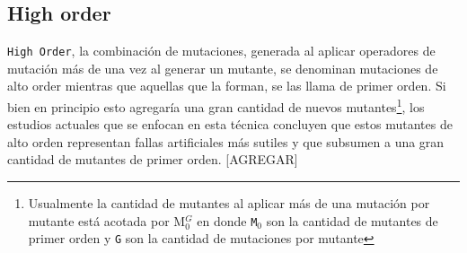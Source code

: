 \subsection{High order}

\texttt{High Order}, la combinaci\'on de mutaciones, generada al aplicar operadores de mutaci\'on m\'as de una vez al generar un mutante, se denominan mutaciones de alto order mientras que aquellas que la forman, se las llama de primer orden. Si bien en principio esto agregar\'ia una gran cantidad de nuevos mutantes\footnote{Usualmente la cantidad de mutantes al aplicar m\'as de una mutaci\'on por mutante est\'a acotada por M$_0^G$ en donde \texttt{M$_0$} son la cantidad de mutantes de primer orden y \texttt{G} son la cantidad de mutaciones por mutante}, los estudios actuales que se enfocan en esta t\'ecnica concluyen que estos mutantes de alto orden representan fallas artificiales m\'as sutiles y que subsumen a una gran cantidad de mutantes de primer orden. [AGREGAR]